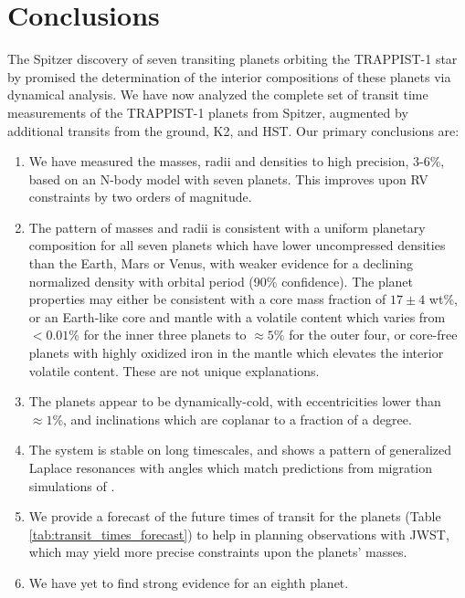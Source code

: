 \documentclass[fleqn,usenatbib]{mnras} %
\begin{document}
\section{Conclusions} \label{sec:conclusions}

The Spitzer discovery of seven transiting planets orbiting the TRAPPIST-1 star by \citet{Gillon2017} promised the determination of the interior compositions of these planets via dynamical analysis.
We have now analyzed the complete set of transit time measurements
of the TRAPPIST-1 planets from  Spitzer, augmented by
additional transits from the ground, K2, and HST.  Our primary conclusions
are:

\begin{enumerate}
    \item  We have measured the masses, radii and densities to high precision, 3-6\%, based on an N-body model with seven planets.  This improves upon RV constraints by two orders of magnitude.
    \item  The pattern of masses and radii is consistent with a uniform planetary composition for all seven planets
    which have lower uncompressed densities than the Earth, Mars or Venus, with weaker evidence for a declining normalized density with orbital period (90\% confidence). The planet properties may either be consistent with 
    a core mass fraction of $17{\pm}4$ wt\%, or an Earth-like core and mantle with a volatile
    content which varies from ${<}0.01$\% for the inner three planets to ${\approx} 5$\%
    for the outer four, or core-free planets with highly oxidized iron in the mantle which elevates the interior volatile content.  These are not unique explanations.
    \item  The planets appear to be dynamically-cold, with eccentricities lower than
    ${\approx }1$\%, and inclinations which are coplanar to a fraction of a degree.
    \item The system is stable on long timescales, and shows a pattern of generalized Laplace resonances with angles which match predictions from migration simulations of \citet{Mah2018}.
    \item We provide a forecast of the future times of transit for the planets (Table \ref{tab:transit_times_forecast}) to help in planning observations with JWST, which may yield more precise constraints upon the planets' masses.
    \item We have yet to find strong evidence for an eighth planet.
\end{enumerate}
\end{document}
